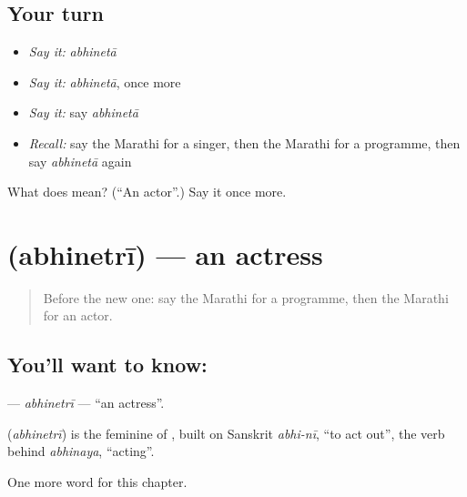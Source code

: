 \subsection*{Your turn}
\begin{itemize}
\raggedright
  \item \emph{Say it:} \emph{abhinetā}
  \item \emph{Say it:} \emph{abhinetā}, once more
  \item \emph{Say it:} say \emph{abhinetā}
  \item \emph{Recall:} say the Marathi for a singer, then the Marathi for a programme, then say \emph{abhinetā} again
\end{itemize}

\begin{tcolorbox}[breakable,colback=teal!4,colframe=teal!35!black,title={Before you move on}]
What does  mean? (\textquotedblleft{}An actor\textquotedblright{}.) Say it once more.
\end{tcolorbox}
\section[\texorpdfstring{\mr{अभिनेत्री} (abhinetrī)}{अभिनेत्री (abhinetrī)}]{ (abhinetrī) — an actress}

\label{lesson:MR-C263-abhinetri}



\begin{quote}
Before the new one: say the Marathi for a programme, then the Marathi for an actor.
\end{quote}

\subsection*{You'll want to know: }
\textbf{} — \emph{abhinetrī} — \textquotedblleft{}an actress\textquotedblright{}.

\begin{cousinweb}
\textbf{} (\emph{abhinetrī}) is the feminine of \textbf{}, built on Sanskrit \emph{abhi-nī}, \textquotedblleft{}to act out\textquotedblright{}, the verb behind \emph{abhinaya}, \textquotedblleft{}acting\textquotedblright{}.
\end{cousinweb}

\begin{grammarlens}[title={What you've built}]
One more word for this chapter.
\end{grammarlens}

